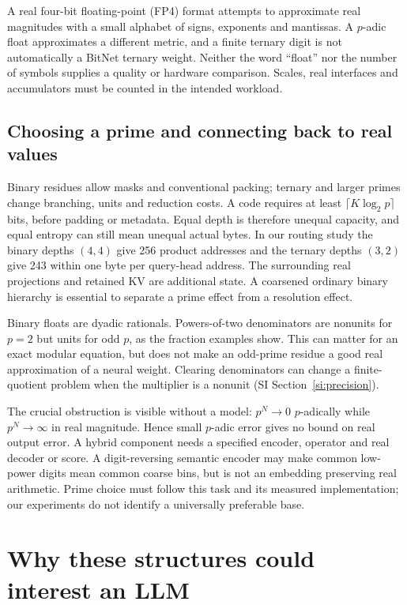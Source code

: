 \documentclass[11pt]{article}
\begin{document}
A real four-bit floating-point (FP4) format attempts to approximate real magnitudes with a small
alphabet of signs, exponents and mantissas. A \(p\)-adic float approximates a different
metric, and a finite ternary digit is not automatically a BitNet ternary
weight. Neither the word ``float'' nor the number of symbols supplies a
quality or hardware comparison. Scales, real interfaces and accumulators
must be counted in the intended workload.

\subsection{Choosing a prime and connecting back to real values}

Binary residues allow masks and conventional packing; ternary and larger
primes change branching, units and reduction costs. A code requires at least
\(\lceil K\log_2p\rceil\) bits, before padding or metadata. Equal depth is
therefore unequal capacity, and equal entropy can still mean unequal actual
bytes. In our routing study the binary depths \((4,4)\) give 256 product
addresses and the ternary depths \((3,2)\) give 243 within one byte per
query-head address. The surrounding real projections and retained KV are
additional state. A coarsened ordinary binary hierarchy is essential to
separate a prime effect from a resolution effect.

Binary floats are dyadic rationals. Powers-of-two denominators are nonunits
for \(p=2\) but units for odd \(p\), as the fraction examples show. This
can matter for an exact modular equation, but does not make an odd-prime
residue a good real approximation of a neural weight. Clearing denominators
can change a finite-quotient problem when the multiplier is a nonunit
(SI Section~\ref{si:precision}).

The crucial obstruction is visible without a model:
\(p^N\to0\) \(p\)-adically while \(p^N\to\infty\) in real magnitude.
Hence small \(p\)-adic error gives no bound on real output error. A hybrid
component needs a specified encoder, operator and real decoder or score.
A digit-reversing semantic encoder may make common low-power digits mean
common coarse bins, but is not an embedding preserving real arithmetic.
Prime choice must follow this task and its measured implementation; our
experiments do not identify a universally preferable base.

\section{Why these structures could interest an LLM}
\label{sec:motivation}
\end{document}
